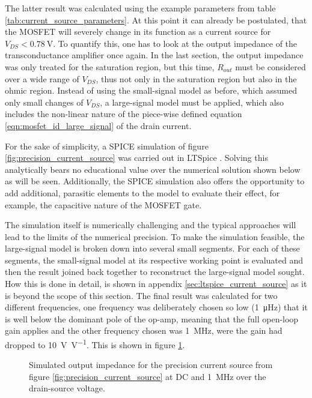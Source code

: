 The latter result was calculated using the example parameters from table \ref{tab:current_source_parameters}. At this point it can already be postulated, that the MOSFET will severely change in its function as a current source for $V_{DS} < \qty{0.78}{\V}$. To quantify this, one has to look at the output impedance of the transconductance amplifier once again. In the last section, the output impedance was only treated for the saturation region, but this time, $R_{out}$ must be considered over a wide range of $V_{DS}$, thus not only in the saturation region but also in the ohmic region. Instead of using the small-signal model as before, which assumed only small changes of $V_{DS}$, a large-signal model must be applied, which also includes the non-linear nature of the piece-wise defined equation \ref{eqn:mosfet_id_large_signal} of the drain current.

For the sake of simplicity, a SPICE simulation of figure \ref{fig:precision_current_source} was carried out in LTSpice \cite{ltspice}. Solving this analytically bears no educational value over the numerical solution shown below as will be seen. Additionally, the SPICE simulation also offers the opportunity to add additional, parasitic elements to the model to evaluate their effect, for example, the capacitive nature of the MOSFET gate.

The simulation itself is numerically challenging and the typical approaches will lead to the limits of the numerical precision. To make the simulation feasible, the large-signal model is broken down into several small segments. For each of these segments, the small-signal model at its respective working point is evaluated and then the result joined back together to reconstruct the large-signal model sought. How this is done in detail, is shown in appendix \ref{sec:ltspice_current_source} as it is beyond the scope of this section. The final result was calculated for two different frequencies, one frequency was deliberately chosen so low (\qty{1}{\micro\Hz}) that it is well below the dominant pole of the op-amp, meaning that the full open-loop gain applies and the other frequency chosen was \qty{1}{\MHz}, were the gain had dropped to \qty[per-mode=power]{10}{\V \per V}. This is shown in figure \ref{fig:ltspice_output_impedance_simulation}.

\begin{figure}[ht]
    \centering
    
    \caption{Simulated output impedance for the precision current source from figure \ref{fig:precision_current_source} at DC and \qty{1}{\MHz} over the drain-source voltage.}
    \label{fig:ltspice_output_impedance_simulation}
\end{figure}

